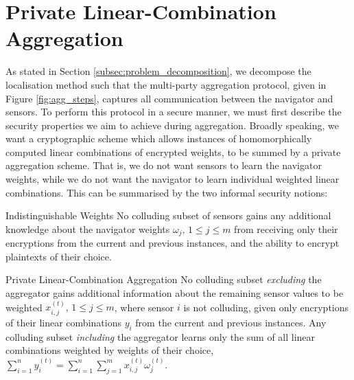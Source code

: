 \documentclass[10pt,journal,compsoc]{IEEEtran}
\theoremstyle{definition}
\theoremstyle{definition}
\theoremstyle{remark}
\begin{document}
% 
%                                                                                     
%                                                                                     
%                                                                                     
% 

\section{Private Linear-Combination Aggregation} \label{sec:lcao_definition}
As stated in Section \ref{subsec:problem_decomposition}, we decompose the localisation method such that the multi-party aggregation protocol, given in Figure \ref{fig:agg_steps}, captures all communication between the navigator and sensors. To perform this protocol in a secure manner, we must first describe the security properties we aim to achieve during aggregation. Broadly speaking, we want a cryptographic scheme which allows instances of homomorphically computed linear combinations of encrypted weights, to be summed by a private aggregation scheme. That is, we do not want sensors to learn the navigator weights, while we do not want the navigator to learn individual weighted linear combinations. This can be summarised by the two informal security notions:
\begin{LaTeXdescription}
    \item[Indistinguishable Weights] No colluding subset of sensors gains any additional knowledge about the navigator weights $\omega_j,\,1\leq j \leq m$ from receiving only their encryptions from the current and previous instances, and the ability to encrypt plaintexts of their choice.
    \item[Private Linear-Combination Aggregation] No colluding subset \textit{excluding} the aggregator gains additional information about the remaining sensor values to be weighted $x^{(t)}_{i,j},\,1\leq j\leq m$, where sensor $i$ is not colluding, given only encryptions of their linear combinations $y_i$ from the current and previous instances. Any colluding subset \textit{including} the aggregator learns only the sum of all linear combinations weighted by weights of their choice, $\sum^{n}_{i=1}y_i^{(t)}=\sum^{n}_{i=1}\sum^{m}_{j=1} x^{(t)}_{i,j}\omega^{(t)}_j$.
\end{LaTeXdescription}
\end{document}
